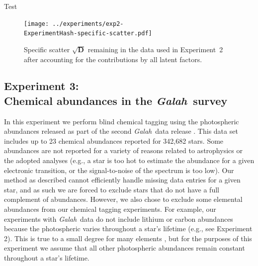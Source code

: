 \documentclass[twocolumn]{aastex62}
\newcommand{\project}[1]{\textsl{#1}}
\newcommand{\Galah}{\project{Galah}}
\newcommand{\vect}[1]{\boldsymbol{\mathbf{#1}}}
\renewcommand{\vec}[1]{\vect{#1}}
\newcommand{\specificvariance}{\vec{D}}
\newcommand{\ExperimentHash}{96ff8}
\begin{document}

Test \the\textwidth

\begin{figure}
	\texttt{[image: ../experiments/exp2-\\ExperimentHash-specific-scatter.pdf]}
	\caption{Specific scatter $\sqrt{\specificvariance}$ remaining in the \citet{Barklem:2005} data used in
			 Experiment~2 after accounting for the contributions by all latent
			 factors.}
    \label{fig:exp2-specific-scatter}
\end{figure}



\subsection{Experiment 3:\\Chemical abundances in the \Galah\ survey}
\label{sec:exp4}

In this experiment we perform blind chemical tagging using the 
photospheric abundances released as part of the second \Galah\ 
data release \citep{Buder:2018}. This data set includes
up to 23 chemical abundances reported for 342,682 stars.
Some abundances are not reported for a variety of 
reasons related to astrophysics or the adopted analyses
(e.g., a star is too hot to estimate the abundance for a given
electronic transition, or the signal-to-noise of the spectrum is too low).
Our method as described cannot efficiently handle missing data 
entries for a given star, and as such we are forced to exclude stars that
do not have a full complement of abundances. However, we also
chose to exclude some elemental abundances from our chemical
tagging experiments. For example, our experiments
with \Galah\ data do not include lithium or carbon abundances because the
photospheric varies throughout a star's lifetime (e.g., see Experiment 2). This is true
to a small degree for many elements \citep[e.g.,][]{Dotter:2017},
but for the purposes of this experiment we assume that all other
photospheric abundances remain constant throughout a star's
lifetime.
\end{document}

